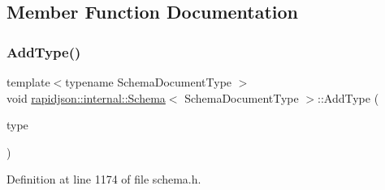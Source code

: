 \subsection{Member Function Documentation}
\mbox{\label{classrapidjson_1_1internal_1_1_schema_a84fb6f656ae61847b69af889441a751c}} 
\subsubsection{\texorpdfstring{AddType()}{AddType()}}
{\footnotesize\ttfamily template$<$typename Schema\+Document\+Type $>$ \\
void \mbox{\hyperlink{classrapidjson_1_1internal_1_1_schema}{rapidjson\+::internal\+::\+Schema}}$<$ Schema\+Document\+Type $>$\+::Add\+Type (\begin{DoxyParamCaption}\item[{const \mbox{\hyperlink{classrapidjson_1_1internal_1_1_schema_a3979a9083c598195927c08c6e3ba91d1}{Value\+Type}} \&}]{type }\end{DoxyParamCaption})\hspace{0.3cm}{\ttfamily [private]}}



Definition at line 1174 of file schema.\+h.


